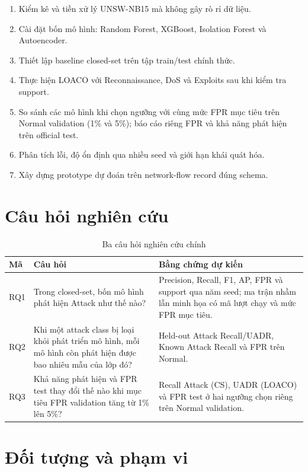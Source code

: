 \documentclass[12pt,a4paper,oneside]{report}
\begin{document}
\begin{enumerate}[label=\arabic*.,leftmargin=1.1cm,itemsep=0.2em]
  \item Kiểm kê và tiền xử lý UNSW-NB15 mà không gây rò rỉ dữ liệu.
  \item Cài đặt bốn mô hình: Random Forest, XGBoost, Isolation Forest và Autoencoder.
  \item Thiết lập baseline closed-set trên tập train/test chính thức.
  \item Thực hiện LOACO với Reconnaissance, DoS và Exploits sau khi kiểm tra support.
  \item So sánh các mô hình khi chọn ngưỡng với cùng mức FPR mục tiêu trên Normal validation (1\% và 5\%); báo cáo riêng FPR và khả năng phát hiện trên official test.
  \item Phân tích lỗi, độ ổn định qua nhiều seed và giới hạn khái quát hóa.
  \item Xây dựng prototype dự đoán trên network-flow record đúng schema.
\end{enumerate}

\section{Câu hỏi nghiên cứu}

\begin{table}[H]
\centering
\caption{Ba câu hỏi nghiên cứu chính}
\label{tab:rq}
\begin{tabularx}{\textwidth}{L{1.3cm}Y Y}
\toprule
\textbf{Mã} & \textbf{Câu hỏi} & \textbf{Bằng chứng dự kiến} \\
\midrule
RQ1 & Trong closed-set, bốn mô hình phát hiện Attack như thế nào? & Precision, Recall, F1, AP, FPR và support qua năm seed; ma trận nhầm lẫn minh họa có mã lượt chạy và mức FPR mục tiêu. \\
RQ2 & Khi một attack class bị loại khỏi phát triển mô hình, mỗi mô hình còn phát hiện được bao nhiêu mẫu của lớp đó? & Held-out Attack Recall/UADR, Known Attack Recall và FPR trên Normal. \\
RQ3 & Khả năng phát hiện và FPR test thay đổi thế nào khi mục tiêu FPR validation tăng từ 1\% lên 5\%? & Recall Attack (CS), UADR (LOACO) và FPR test ở hai ngưỡng chọn riêng trên Normal validation. \\
\bottomrule
\end{tabularx}
\end{table}

\section{Đối tượng và phạm vi}
\end{document}
